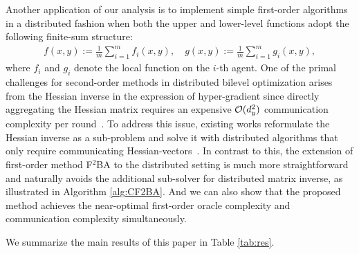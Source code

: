 \documentclass{article}
\begin{document}
Another application of our analysis is to implement simple first-order algorithms in a distributed fashion when both the upper and lower-level functions adopt the following finite-sum structure:
\begin{align}  \label{prob:fn}
    f(x,y) := \frac{1}{m} \sum_{i=1}^m f_i(x,y), \quad g(x,y) := \frac{1}{m} \sum_{i=1}^m g_i(x,y),
\end{align}
where $f_i$ and $g_i$ denote the local function on the $i$-th agent. 
One of the primal challenges for second-order methods in distributed bilevel optimization arises from the Hessian inverse in the expression of hyper-gradient since directly aggregating the Hessian matrix requires an expensive ${\mathcal{O}}(d_{y}^2)$ communication complexity per round~\cite{yangdecentralized,lu2022stochastic}. To address this issue, existing works reformulate the Hessian inverse as a sub-problem and solve it with distributed algorithms that only require communicating Hessian-vectors~\cite{tarzanagh2022fednest,chen2022decentralized,xiao2023communication}.
In contrast to this, the extension of first-order method F${}^2$BA to the distributed setting is much more straightforward and naturally avoids the additional sub-solver for distributed matrix inverse, 
as illustrated in Algorithm \ref{alg:CF2BA}. And we can also show that the proposed method achieves the near-optimal first-order oracle complexity and communication complexity simultaneously.


We summarize the main results of this paper in Table \ref{tab:res}.
\end{document}
